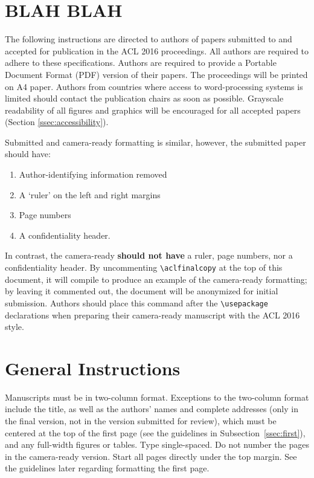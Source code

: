 \documentclass[11pt]{article}
\begin{document}
\section{BLAH BLAH}

The following instructions are directed to authors of papers submitted to and accepted
for publication in the ACL 2016 proceedings.  All authors are required
to adhere to these specifications. Authors are required to provide 
a Portable Document Format (PDF) version of
their papers.  The proceedings will be printed on A4 paper.
Authors from countries where access to word-processing systems is
limited should contact the publication chairs as soon as possible.
 Grayscale readability of all figures and
graphics will be encouraged for all accepted papers
(Section \ref{ssec:accessibility}).  

Submitted and camera-ready formatting is similar,
  however, the submitted paper should have:
\begin{enumerate} 
\item Author-identifying information removed
\item A `ruler' on the left and right margins
\item Page numbers 
\item A confidentiality header.  
\end{enumerate}
In contrast, the camera-ready {\bf should  not have} a ruler, page numbers, nor a confidentiality header.  By uncommenting {\small\verb|\aclfinalcopy|} at the top of this 
 document, it will compile to produce an example of the camera-ready formatting; by leaving it commented out, the document will be anonymized for initial submission.  Authors should place this command after the {\small\verb|\usepackage|} declarations when preparing their camera-ready manuscript with the ACL 2016 style.


\section{General Instructions}

Manuscripts must be in two-column format.  Exceptions to the
two-column format include the title, as well as the 
authors' names and complete
addresses (only in the final version, not in the version submitted for review), 
which must be centered at the top of the first page (see
the guidelines in Subsection~\ref{ssec:first}), and any full-width
figures or tables.  Type single-spaced.  Do not number the pages 
in the camera-ready version.
Start all pages directly under the top margin.  See the guidelines
later regarding formatting the first page.
\end{document}
